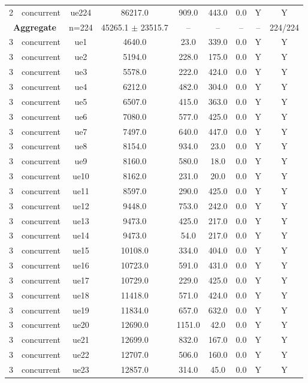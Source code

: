 \begin{table}[ht]
\begin{tabular}{|c|c|c|c|c|c|c|c|c|}
2 & concurrent & ue224 & 86217.0 & 909.0 & 443.0 & 0.0 & Y & Y \\
\multicolumn{2}{|c|}{\textbf{Aggregate}} & n=224 & 45265.1 $\pm$ 23515.7 & -- & -- & -- & -- & 224/224 \\
\hline
3 & concurrent & ue1 & 4640.0 & 23.0 & 339.0 & 0.0 & Y & Y \\
3 & concurrent & ue2 & 5194.0 & 228.0 & 175.0 & 0.0 & Y & Y \\
3 & concurrent & ue3 & 5578.0 & 222.0 & 424.0 & 0.0 & Y & Y \\
3 & concurrent & ue4 & 6212.0 & 482.0 & 304.0 & 0.0 & Y & Y \\
3 & concurrent & ue5 & 6507.0 & 415.0 & 363.0 & 0.0 & Y & Y \\
3 & concurrent & ue6 & 7080.0 & 577.0 & 425.0 & 0.0 & Y & Y \\
3 & concurrent & ue7 & 7497.0 & 640.0 & 447.0 & 0.0 & Y & Y \\
3 & concurrent & ue8 & 8154.0 & 934.0 & 23.0 & 0.0 & Y & Y \\
3 & concurrent & ue9 & 8160.0 & 580.0 & 18.0 & 0.0 & Y & Y \\
3 & concurrent & ue10 & 8162.0 & 231.0 & 20.0 & 0.0 & Y & Y \\
3 & concurrent & ue11 & 8597.0 & 290.0 & 425.0 & 0.0 & Y & Y \\
3 & concurrent & ue12 & 9448.0 & 753.0 & 242.0 & 0.0 & Y & Y \\
3 & concurrent & ue13 & 9473.0 & 425.0 & 217.0 & 0.0 & Y & Y \\
3 & concurrent & ue14 & 9473.0 & 54.0 & 217.0 & 0.0 & Y & Y \\
3 & concurrent & ue15 & 10108.0 & 334.0 & 404.0 & 0.0 & Y & Y \\
3 & concurrent & ue16 & 10723.0 & 591.0 & 431.0 & 0.0 & Y & Y \\
3 & concurrent & ue17 & 10729.0 & 229.0 & 425.0 & 0.0 & Y & Y \\
3 & concurrent & ue18 & 11418.0 & 571.0 & 424.0 & 0.0 & Y & Y \\
3 & concurrent & ue19 & 11834.0 & 657.0 & 632.0 & 0.0 & Y & Y \\
3 & concurrent & ue20 & 12690.0 & 1151.0 & 42.0 & 0.0 & Y & Y \\
3 & concurrent & ue21 & 12699.0 & 832.0 & 167.0 & 0.0 & Y & Y \\
3 & concurrent & ue22 & 12707.0 & 506.0 & 160.0 & 0.0 & Y & Y \\
3 & concurrent & ue23 & 12857.0 & 314.0 & 45.0 & 0.0 & Y & Y \\

\end{tabular}
\end{table}
